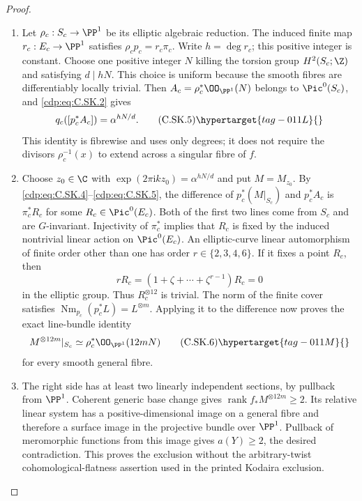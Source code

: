 \begin{proof}
\begin{enumerate}[label={$\langle1\rangle$\arabic*.},leftmargin=*]
\item Let $\rho_c:S_c\to\PP^1$ be its elliptic algebraic
reduction. The induced finite map $r_c:E_c\to\PP^1$
satisfies $\rho_c p_c=r_c\pi_c$. Write $h=\deg r_c$;
this positive integer is constant. Choose one positive
integer $N$ killing the torsion group $H^2(S_c;\Z)$
and satisfying $d\mid hN$. This choice is uniform
because the smooth fibres are differentiably locally
trivial. Then
$A_c=\rho_c^*\OO_{\PP^1}(N)$ belongs to $\Pic^0(S_c)$,
and \eqref{cdp:eq:C.SK.2} gives
\[
 q_c([p_c^*A_c])=\alpha^{hN/d}.
\tag{C.SK.5}\hypertarget{tag-011L}{}\label{cdp:eq:C.SK.5}
\]
This identity is fibrewise and uses only degrees; it
does not require the divisors $\rho_c^{-1}(x)$ to
extend across a singular fibre of $f$.

\item Choose $z_0\in\C$ with
$\exp(2\pi\mathrm i k z_0)=\alpha^{hN/d}$ and put
$M=M_{z_0}$. By \eqref{cdp:eq:C.SK.4}--\eqref{cdp:eq:C.SK.5}, the difference of
$p_c^*(M|_{S_c})$ and $p_c^*A_c$ is
$\pi_c^*R_c$ for some $R_c\in\Pic^0(E_c)$.
Both of the first two lines come from $S_c$ and are
$G$-invariant. Injectivity of $\pi_c^*$ implies that
$R_c$ is fixed by the induced nontrivial linear action
on $\Pic^0(E_c)$. An elliptic-curve linear automorphism
of finite order other than one has order
$r\in\{2,3,4,6\}$. If it fixes a point $R_c$, then
\[
 rR_c=(1+\zeta+\cdots+\zeta^{r-1})R_c=0
\]
in the elliptic group. Thus $R_c^{\otimes12}$ is
trivial. The norm of the finite cover satisfies
$\operatorname{Nm}_{p_c}(p_c^*L)=L^{\otimes m}$.
Applying it to the difference now proves the exact
line-bundle identity
\[
 M^{\otimes12m}|_{S_c}
       \simeq \rho_c^*\OO_{\PP^1}(12mN)
\tag{C.SK.6}\hypertarget{tag-011M}{}\label{cdp:eq:C.SK.6}
\]
for every smooth general fibre.

\item The right side has at least two linearly independent
sections, by pullback from $\PP^1$. Coherent generic
base change gives
$\operatorname{rank}f_*M^{\otimes12m}\ge2$.
Its relative linear system has a positive-dimensional
image on a general fibre and therefore a surface
image in the projective bundle over $\PP^1$.
Pullback of meromorphic functions from this image
gives $a(Y)\ge2$, the desired contradiction.
This proves the exclusion without the arbitrary-twist
cohomological-flatness assertion used in the printed
Kodaira exclusion.

\end{enumerate}
\end{proof}
